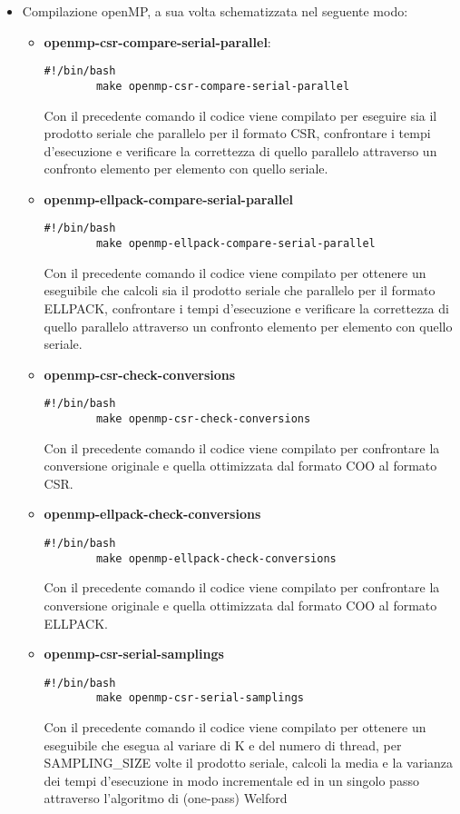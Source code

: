 \documentclass{article}
\begin{document}
\begin{itemize}
    \item Compilazione openMP, a sua volta schematizzata nel seguente modo:
    \begin{itemize}
        \item \textbf{openmp-csr-compare-serial-parallel}: \begin{lstlisting}[style=bashstyle]
        #!/bin/bash
        make openmp-csr-compare-serial-parallel 
        \end{lstlisting} Con il precedente comando il codice viene compilato per eseguire sia il prodotto seriale che parallelo per il formato CSR, confrontare i tempi d'esecuzione e verificare la correttezza di quello parallelo attraverso un confronto elemento per elemento con quello seriale.
        \item \textbf{openmp-ellpack-compare-serial-parallel}  \begin{lstlisting}[style=bashstyle]
        #!/bin/bash
        make openmp-ellpack-compare-serial-parallel
        \end{lstlisting} Con il precedente comando il codice viene compilato per ottenere un eseguibile che calcoli sia il prodotto seriale che parallelo per il formato ELLPACK, confrontare i tempi d'esecuzione e verificare la correttezza di quello parallelo attraverso un confronto elemento per elemento con quello seriale.
        \item \textbf{openmp-csr-check-conversions}
         \begin{lstlisting}[style=bashstyle]
        #!/bin/bash
        make openmp-csr-check-conversions
        \end{lstlisting} Con il precedente comando il codice viene compilato per confrontare la conversione originale e quella ottimizzata dal formato COO al formato CSR.
        \item \textbf{openmp-ellpack-check-conversions}
        \begin{lstlisting}[style=bashstyle]
        #!/bin/bash
        make openmp-ellpack-check-conversions
        \end{lstlisting} Con il precedente comando il codice viene compilato per confrontare la conversione originale e quella ottimizzata dal formato COO al formato ELLPACK.
        \item \textbf{openmp-csr-serial-samplings}
         \begin{lstlisting}[style=bashstyle]
        #!/bin/bash
        make openmp-csr-serial-samplings
        \end{lstlisting} Con il precedente comando il codice viene compilato per ottenere un eseguibile che esegua al variare di K e del numero di thread, per SAMPLING\_SIZE volte il prodotto seriale, calcoli la media e la varianza dei tempi d'esecuzione in modo incrementale ed in un singolo passo attraverso l'algoritmo di (one-pass) Welford

\end{itemize}
\end{itemize}
\end{document}
